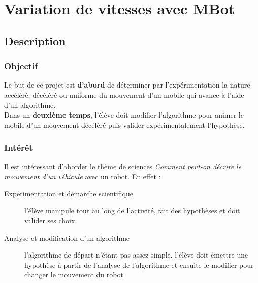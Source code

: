 \section{Variation de vitesses avec MBot}


%
\pagestyle{mbot} %

\subsection{Description}

\subsubsection{Objectif}


\begin{formule}
Le but de ce projet est \textbf{d'abord} de déterminer par l'expérimentation la nature accéléré, décéléré ou uniforme du mouvement d'un mobile qui avance à l'aide d'un algorithme.\\
Dans un \textbf{deuxième temps}, l'élève doit modifier l'algorithme pour animer le mobile d'un mouvement décéléré puis valider expérimentalement l'hypothèse.
\end{formule}


\subsubsection{Intérêt}

Il est intéressant d'aborder le thème de sciences \textit{Comment peut-on décrire le mouvement d'un véhicule } avec un robot. En effet :

\begin{description}
    \item [Expérimentation et démarche scientifique] l'élève manipule tout au long de l'activité, fait des hypothèses et doit valider ses choix
    \item [Analyse et modification d'un algorithme] l'algorithme de départ n'étant pas assez simple, l'élève doit émettre une hypothèse à partir de l'analyse de l'algorithme et ensuite le modifier pour changer le mouvement du robot
\end{description}


